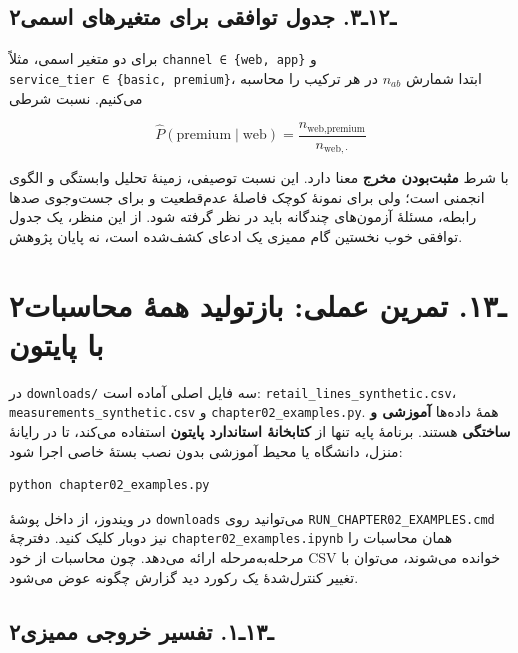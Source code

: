 \documentclass[12pt,a4paper,oneside]{book}
\begin{document}
\subsection{۲ـ۱۲ـ۳. جدول توافقی برای متغیرهای اسمی}\label{ux640ux6f1ux6f2ux640ux6f3.-ux62cux62fux648ux644-ux62aux648ux627ux641ux642ux6cc-ux628ux631ux627ux6cc-ux645ux62aux63aux6ccux631ux647ux627ux6cc-ux627ux633ux645ux6cc}

برای دو متغیر اسمی، مثلاً \texttt{channel\ ∈\ \{web,\ app\}} و \texttt{service\_tier\ ∈\ \{basic,\ premium\}}، ابتدا شمارش \(n_{ab}\) در هر ترکیب را محاسبه می‌کنیم. نسبت شرطی

\[
\widehat P(\text{premium}\mid\text{web})
=\frac{n_{\text{web},\text{premium}}}{n_{\text{web},\cdot}}
\]

با شرط \textbf{مثبت‌بودن مخرج} معنا دارد. این نسبت توصیفی، زمینهٔ تحلیل وابستگی و الگوی انجمنی است؛ ولی برای نمونهٔ کوچک فاصلهٔ عدم‌قطعیت و برای جست‌وجوی صدها رابطه، مسئلهٔ آزمون‌های چندگانه باید در نظر گرفته شود. از این منظر، یک جدول توافقی خوب نخستین گام ممیزی یک ادعای کشف‌شده است، نه پایان پژوهش.

\section{۲ـ۱۳. تمرین عملی: بازتولید همهٔ محاسبات با پایتون}\label{ux640ux6f1ux6f3.-ux62aux645ux631ux6ccux646-ux639ux645ux644ux6cc-ux628ux627ux632ux62aux648ux644ux6ccux62f-ux647ux645ux647-ux645ux62dux627ux633ux628ux627ux62a-ux628ux627-ux67eux627ux6ccux62aux648ux646}

در \texttt{downloads/} سه فایل اصلی آماده است: \texttt{retail\_lines\_synthetic.csv}، \texttt{measurements\_synthetic.csv} و \texttt{chapter02\_examples.py}. همهٔ داده‌ها \textbf{آموزشی و ساختگی} هستند. برنامهٔ پایه تنها از \textbf{کتابخانهٔ استاندارد پایتون} استفاده می‌کند، تا در رایانهٔ منزل، دانشگاه یا محیط آموزشی بدون نصب بستهٔ خاصی اجرا شود:

\begin{verbatim}
python chapter02_examples.py
\end{verbatim}

در ویندوز، از داخل پوشهٔ \texttt{downloads} می‌توانید روی \texttt{RUN\_CHAPTER02\_EXAMPLES.cmd} نیز دوبار کلیک کنید. دفترچهٔ \texttt{chapter02\_examples.ipynb} همان محاسبات را مرحله‌به‌مرحله ارائه می‌دهد. چون محاسبات از خود CSV خوانده می‌شوند، می‌توان با تغییر کنترل‌شدهٔ یک رکورد دید گزارش چگونه عوض می‌شود.

\subsection{۲ـ۱۳ـ۱. تفسیر خروجی ممیزی}\label{ux640ux6f1ux6f3ux640ux6f1.-ux62aux641ux633ux6ccux631-ux62eux631ux648ux62cux6cc-ux645ux645ux6ccux632ux6cc}
\end{document}
